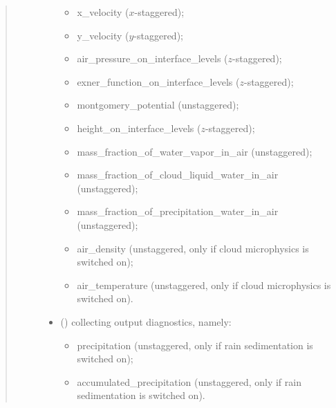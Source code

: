 \documentclass[letterpaper,10pt,english]{sphinxmanual}
\begin{document}
\begin{fulllineitems}
\begin{fulllineitems}
\begin{quote}
\begin{description}
\begin{itemize}
\begin{itemize}
\item {} 
x\_velocity (\(x\)-staggered);

\item {} 
y\_velocity (\(y\)-staggered);

\item {} 
air\_pressure\_on\_interface\_levels (\(z\)-staggered);

\item {} 
exner\_function\_on\_interface\_levels (\(z\)-staggered);

\item {} 
montgomery\_potential (unstaggered);

\item {} 
height\_on\_interface\_levels (\(z\)-staggered);

\item {} 
mass\_fraction\_of\_water\_vapor\_in\_air (unstaggered);

\item {} 
mass\_fraction\_of\_cloud\_liquid\_water\_in\_air (unstaggered);

\item {} 
mass\_fraction\_of\_precipitation\_water\_in\_air (unstaggered);

\item {} 
air\_density (unstaggered, only if cloud microphysics is switched on);

\item {} 
air\_temperature (unstaggered, only if cloud microphysics is switched on).

\end{itemize}

\item {} 
 () \textendash{}  collecting output diagnostics, namely:
\begin{itemize}
\item {} 
precipitation (unstaggered, only if rain sedimentation is switched on);

\item {} 
accumulated\_precipitation (unstaggered, only if rain sedimentation is switched on).

\end{itemize}

\end{itemize}


\end{description}\end{quote}


\end{fulllineitems}
\end{fulllineitems}
\end{document}
